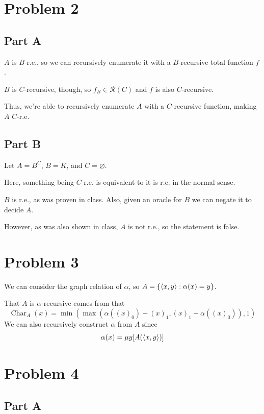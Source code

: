 \documentclass[12pt]{article}
\DeclareMathOperator{\ch}{Char}
\begin{document}
\section{Problem 2}

\subsection{Part A}

$A$ is $B$-r.e., so we can recursively enumerate it with a $B$-recursive total function $f$.

$B$ is $C$-recursive, though, so $f_B \in \mathcal{R}(C)$ and $f$ is also $C$-recursive.

Thus, we're able to recursively enumerate $A$ with a $C$-recursive function, making $A$ $C$-r.e.

\subsection{Part B}

Let $A=B^C$, $B=K$, and $C=\varnothing$.

Here, something being $C$-r.e. is equivalent to it is r.e. in the normal sense.

$B$ is r.e., as was proven in class.
Also, given an oracle for $B$ we can negate it to decide $A$.

However, as was also shown in class, $A$ is not r.e., so the statement is false.

\section{Problem 3}

We can consider the graph relation of $\alpha$, so $A=\{\braket{x, y}: \alpha(x)=y\}$.

That $A$ is $\alpha$-recursive comes from that
\[\ch_A(x)=\min(\max(\alpha((x)_0)-(x)_1, (x)_1 - \alpha((x)_0)), 1)\]
We can also recursively construct $\alpha$ from $A$ since
\[\alpha(x)=\mu y[A(\braket{x, y})]\]

\pagebreak

\section{Problem 4}

\subsection{Part A}\label{sec:4a}
\end{document}
